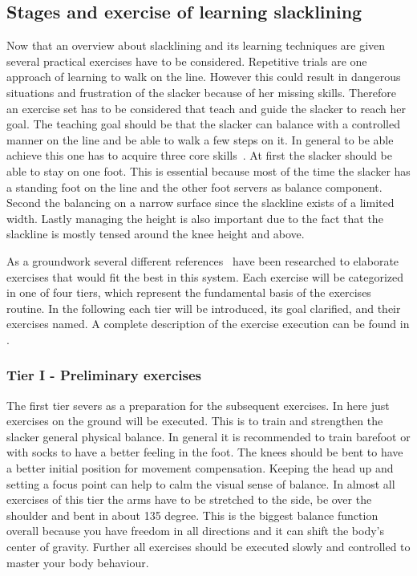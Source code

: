 \subsection{Stages and exercise of learning slacklining}\label{3_3_2_StagesExercises}
Now that an overview about slacklining and its learning techniques are given several practical exercises have to be considered. Repetitive trials are one approach of learning to walk on the line. However this could result in dangerous situations and frustration of the slacker because of her missing skills. Therefore an exercise set has to be considered that teach and guide the slacker to reach her goal. The teaching goal should be that the slacker can balance with a controlled manner on the line and be able to walk a few steps on it. In general to be able achieve this one has to acquire three core skills~\cite{Kroiss2007-ab}. At first the slacker should be able to stay on one foot. This is essential because most of the time the slacker has a standing foot on the line and the other foot servers as balance component. Second the balancing on a narrow surface since the slackline exists of a limited width. Lastly managing the height is also important due to the fact that the slackline is mostly tensed around the knee height and above.

As a groundwork several different references~\cite{Balcom2005-wl, Donath2013-kk, Donath2016-gm, Granacher2010-ow, Keller2012-xh, Kleindl2011-bl, Kroiss2007-ab, Pfusterschmied2013-yy, Thomann2013-aa} have been researched to elaborate exercises that would fit the best in this system. Each exercise will be categorized in one of four tiers, which represent the fundamental basis of the exercises routine. In the following each tier will be introduced, its goal clarified, and their exercises named. A complete description of the exercise execution can be found in .

\subsubsection{Tier I - Preliminary exercises}
The first tier severs as a preparation for the subsequent exercises. In here just exercises on the ground will be executed. This is to train and strengthen the slacker general physical balance. In general it is recommended to train barefoot or with socks to have a better feeling in the foot. The knees should be bent to have a better initial position for movement compensation. Keeping the head up and setting a focus point can help to calm the visual sense of balance. In almost all exercises of this tier the arms have to be stretched to the side, be over the shoulder and bent in about 135 degree. This is the biggest balance function overall because you have freedom in all directions and it can shift the body's center of gravity. Further all exercises should be executed slowly and controlled to master your body behaviour.

